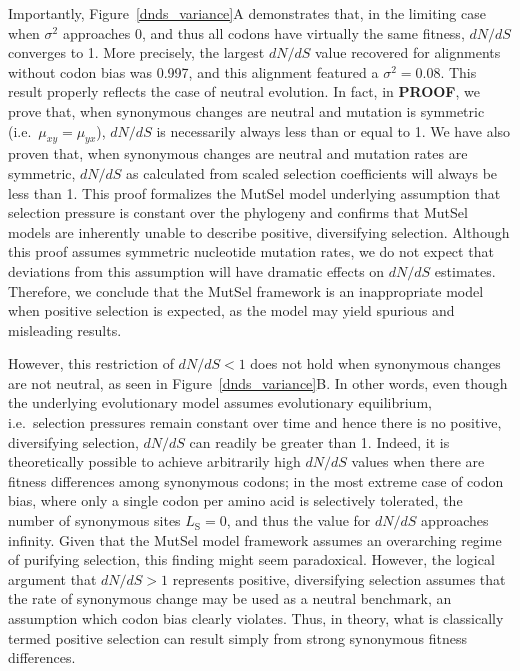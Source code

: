 \documentclass{pnastwo}
\begin{document}
\begin{article}
Importantly, Figure~\ref{dnds_variance}A demonstrates that, in the limiting case when $\sigma^2$ approaches 0, and thus all codons have virtually the same fitness, $dN/dS$ converges to 1. More precisely, the largest $dN/dS$ value recovered for alignments without codon bias was 0.997, and this alignment featured a $\sigma^2 = 0.08$. This result properly reflects the case of neutral evolution. In fact, in \textbf{PROOF}, we prove that, when synonymous changes are neutral and mutation is symmetric (i.e.\ $\mu_{xy} = \mu_{yx}$), $dN/dS$ is necessarily always less than or equal to 1. We have also proven that, when synonymous changes are neutral and mutation rates are symmetric, $dN/dS$ as calculated from scaled selection coefficients will always be less than 1. This proof formalizes the MutSel model underlying assumption that selection pressure is constant over the phylogeny and confirms that MutSel models are inherently unable to describe positive, diversifying selection. Although this proof assumes symmetric nucleotide mutation rates, we do not expect that deviations from this assumption will have dramatic effects on $dN/dS$ estimates. Therefore, we conclude that the MutSel framework is an inappropriate model when positive selection is expected, as the model may yield spurious and misleading results. 

However, this restriction of $dN/dS < 1$ does not hold when synonymous changes are not neutral, as seen in Figure~\ref{dnds_variance}B. In other words, even though the underlying evolutionary model assumes evolutionary equilibrium, i.e.\ selection pressures remain constant over time and hence there is no positive, diversifying selection, $dN/dS$ can readily be greater than 1. Indeed, it is theoretically possible to achieve arbitrarily high $dN/dS$ values when there are fitness differences among synonymous codons; in the most extreme case of codon bias, where only a single codon per amino acid is selectively tolerated, the number of synonymous sites $L_\text{S} = 0$, and thus the value for $dN/dS$ approaches infinity. Given that the MutSel model framework assumes an overarching regime of purifying selection, this finding might seem paradoxical. However, the logical argument that $dN/dS > 1$ represents positive, diversifying selection assumes that the rate of synonymous change may be used as a neutral benchmark, an assumption which codon bias clearly violates. Thus, in theory, what is classically termed positive selection can result simply from strong synonymous fitness differences. 	
		

\end{article}
\end{document}
